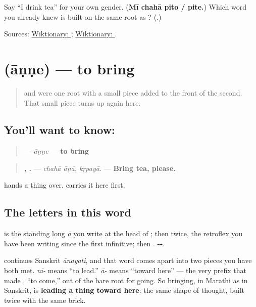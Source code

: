 \begin{tcolorbox}[breakable,colback=teal!4,colframe=teal!35!black,title={Before you move on}]
Say \textquotedblleft{}I drink tea\textquotedblright{} for your own gender. (\textbf{Mī chahā pito / pite.}) Which word you already knew is built on the same root as \textbf{}? (\textbf{}.)

Sources: \href{https://en.wiktionary.org/wiki/\%E0\%A4\%AA\%E0\%A4\%BF\%E0\%A4\%A3\%E0\%A5\%87}{Wiktionary: }; \href{https://en.wiktionary.org/wiki/\%E0\%A4\%AA\%E0\%A4\%BF\%E0\%A4\%AC\%E0\%A4\%A4\%E0\%A4\%BF}{Wiktionary: }.
\end{tcolorbox}
\section[āṇṇe]{ (āṇṇe) — to bring}

\label{lesson:MR-C22-anne}



\begin{quote}
\textbf{} and \textbf{} were one root with a small piece added to the front of the second. That small piece turns up again here.
\end{quote}

\subsection*{You'll want to know: }
\begin{quote}
\textbf{} — \emph{āṇṇe} — \textbf{to bring}
\end{quote}

\begin{quote}
\textbf{ , .} — \emph{chahā āṇā, kṛpayā.} — \textbf{Bring tea, please.}
\end{quote}

\textbf{} hands a thing over. \textbf{} carries it here first.

\subsection*{The letters in this word}
\textbf{} is the standing long \emph{ā} you write at the head of \textbf{}; then \textbf{} twice, the retroflex you have been writing since the first infinitive; then \textbf{}. \textbf{--}.

\begin{cousinweb}
\textbf{} continues Sanskrit \textbf{} \emph{ānayati}, and that word comes apart into two pieces you have both met. \textbf{} \emph{nī-} means \textquotedblleft{}to lead.\textquotedblright{} \textbf{} \emph{ā-} means \textquotedblleft{}toward here\textquotedblright{} — the very prefix that made \textbf{}, \textquotedblleft{}to come,\textquotedblright{} out of the bare root for going. So bringing, in Marathi as in Sanskrit, is \textbf{leading a thing toward here}: the same shape of thought, built twice with the same brick.
\end{cousinweb}

